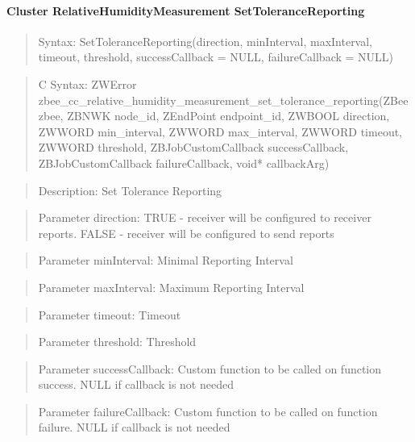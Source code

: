 \paragraph{Cluster RelativeHumidityMeasurement SetToleranceReporting}
\begin{quote}Syntax: SetToleranceReporting(direction, minInterval, maxInterval, timeout, threshold, successCallback = NULL, failureCallback = NULL)\end{quote}
\begin{quote}C Syntax: ZWError zbee\_cc\_relative\_humidity\_measurement\_set\_tolerance\_reporting(ZBee zbee, ZBNWK node\_id, ZEndPoint endpoint\_id, ZWBOOL direction, ZWWORD min\_interval, ZWWORD max\_interval, ZWWORD timeout, ZWWORD threshold, ZBJobCustomCallback successCallback, ZBJobCustomCallback failureCallback, void* callbackArg)\end{quote}
\begin{quote}Description: Set Tolerance Reporting\end{quote}
\begin{quote}Parameter direction: TRUE  - receiver will be configured to receiver reports. FALSE - receiver will be configured to send reports\end{quote}
\begin{quote}Parameter minInterval: Minimal Reporting Interval\end{quote}
\begin{quote}Parameter maxInterval: Maximum Reporting Interval\end{quote}
\begin{quote}Parameter timeout: Timeout\end{quote}
\begin{quote}Parameter threshold: Threshold\end{quote}
\begin{quote}Parameter successCallback: Custom function to be called on function success. NULL if callback is not needed\end{quote}
\begin{quote}Parameter failureCallback: Custom function to be called on function failure. NULL if callback is not needed\end{quote}


